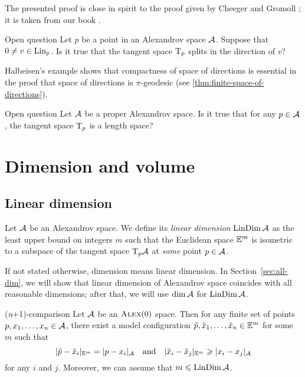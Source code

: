 The presented proof is close in spirit to the proof given by Cheeger and Gromoll \cite{cheeger-gromoll-split};
it is taken from our book \cite{alexander-kapovitch-petrunin2024}.

\begin{thm}{Open question}
Let $p$ be a point in an Alexandrov space $\mathcal{A}$.
Suppose that $0\ne v\in \mathop{\rm Lin}\nolimits_p$.
Is it true that the tangent space $\mathrm{T}_p$ splits in the direction of $v$?
\end{thm}

Halbeisen's example \cite{alexander-kapovitch-petrunin2024,halbeisen} shows that compactness of space of directions is essential in the proof that space of directions is $\pi$-geodesic (see \ref{thm:finite-space-of-directions}).

\begin{thm}{Open question}\label{open:Halb-proper}
Let $\mathcal{A}$ be a proper Alexandrov space.
Is it true that for any $p\in \mathcal{A}$, the tangent space $\mathrm{T}_p$ is a length space?
\end{thm}


\chapter{Dimension and volume}\label{chap:dim}

\section{Linear dimension}

Let $\mathcal{A}$ be an Alexandrov space.
We define its \emph{linear dimension} $\mathop{\rm LinDim}\nolimits \mathcal{A}$ as the least upper bound on integers $m$ such that
the Euclidean space $\mathbb{E}^m$ is isometric to a subspace of the tangent space $\mathrm{T}_p\mathcal{A}$ at \textit{some} point $p\in \mathcal{A}$.

If not stated otherwise, dimension means linear dimension.
In Section~\ref{sec:all-dim}, we will show that linear dimension of Alexandrov space coincides with all reasonable dimensions;
after that, we will use $\operatorname{\rm dim}\nolimits\mathcal{A}$ for $\mathop{\rm LinDim}\nolimits\mathcal{A}$.

\begin{thm}{(\textit{n}+1)-comparison}\label{thm:n+1}
Let $\mathcal{A}$ be an $\textsc{Alex}(0)$ space.
Then for any finite set of points $p,x_1,\dots,x_n\in \mathcal{A}$, there exist a model configuration
$\tilde p,\tilde x_1,\dots,\tilde x_n\in \mathbb{E}^m$ for some $m$ such that
\[|\tilde p-\tilde x_i|_{\mathbb{E}^m}=| p- x_i|_{\mathcal{A}}
\quad\text{and}\quad
|\tilde x_i-\tilde x_j|_{\mathbb{E}^m}\geqslant |x_i- x_j|_{\mathcal{A}}\]
for any $i$ and $j$.
Moreover, we can assume that $m\leqslant \mathop{\rm LinDim}\nolimits\mathcal{A}$. 
\end{thm}

